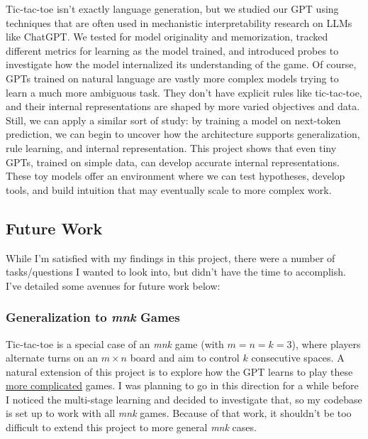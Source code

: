 \documentclass[11pt]{article}
\begin{document}
Tic-tac-toe isn't exactly language generation, but we studied our GPT
using techniques that are often used in mechanistic interpretability
research on LLMs like ChatGPT. We tested for model originality and
memorization, tracked different metrics for learning as the model
trained, and introduced probes to investigate how the model internalized
its understanding of the game. Of course, GPTs trained on natural
language are vastly more complex models trying to learn a much more
ambiguous task. They don't have explicit rules like tic-tac-toe, and
their internal representations are shaped by more varied objectives and
data. Still, we can apply a similar sort of study: by training a model
on next-token prediction, we can begin to uncover how the architecture
supports generalization, rule learning, and internal representation.
This project shows that even tiny GPTs, trained on simple data, can
develop accurate internal representations. These toy models offer an
environment where we can test hypotheses, develop tools, and build
intuition that may eventually scale to more complex work.

    \subsection{Future Work}\label{future-work}

While I'm satisfied with my findings in this project, there were a
number of tasks/questions I wanted to look into, but didn't have the
time to accomplish. I've detailed some avenues for future work below:

\subsubsection{\texorpdfstring{Generalization to \emph{mnk}
Games}{Generalization to mnk Games}}\label{generalization-to-mnk-games}

Tic-tac-toe is a special case of an \emph{mnk} game (with \( m = n = k = 3 \)), where players alternate turns on an \( m \times n \) board and aim to control \( k \) consecutive spaces. A natural extension of this project is to explore how the GPT learns to play these \href{https://www.sciencedirect.com/science/article/pii/S0304397520301146}{more complicated} games. I was planning to go in this direction for a while before I noticed the multi-stage learning and decided to investigate that, so my codebase is set up to work with all \emph{mnk} games. Because of that work, it shouldn't be too difficult to extend this project to more general \emph{mnk} cases.
\end{document}
